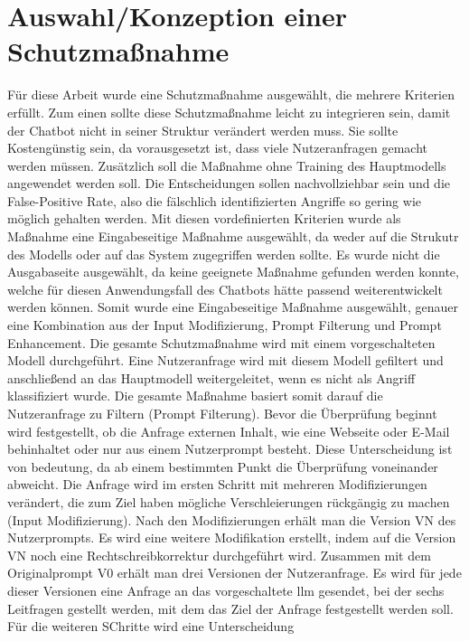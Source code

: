 \section{Auswahl/Konzeption einer Schutzmaßnahme}\label{konzept}

Für diese Arbeit wurde eine Schutzmaßnahme ausgewählt, die mehrere Kriterien erfüllt. Zum einen sollte diese Schutzmaßnahme leicht zu integrieren sein, damit der
Chatbot nicht in seiner Struktur verändert werden muss. Sie sollte Kostengünstig sein, da vorausgesetzt ist, dass viele Nutzeranfragen gemacht werden müssen.
Zusätzlich soll die Maßnahme ohne Training des Hauptmodells angewendet werden soll. Die Entscheidungen sollen nachvollziehbar sein und die False-Positive Rate, also
die fälschlich identifizierten Angriffe so gering wie möglich gehalten werden. 
Mit diesen vordefinierten Kriterien wurde als Maßnahme eine Eingabeseitige Maßnahme ausgewählt, da weder auf die Strukutr des Modells oder auf das System zugegriffen 
werden sollte. Es wurde nicht die Ausgabaseite ausgewählt, da keine geeignete Maßnahme gefunden werden konnte, welche  für diesen Anwendungsfall des Chatbots hätte
passend weiterentwickelt werden können. Somit wurde eine Eingabeseitige Maßnahme ausgewählt, genauer eine Kombination aus der Input Modifizierung, Prompt Filterung
und Prompt Enhancement. 
Die gesamte Schutzmaßnahme wird mit einem vorgeschalteten Modell durchgeführt. Eine Nutzeranfrage wird mit diesem Modell gefiltert und anschließend an das Hauptmodell
weitergeleitet, wenn es nicht als Angriff klassifiziert wurde. Die gesamte Maßnahme basiert somit darauf die Nutzeranfrage zu Filtern (Prompt Filterung). Bevor die 
Überprüfung beginnt wird festgestellt, ob die Anfrage externen Inhalt, wie eine Webseite oder E-Mail behinhaltet oder nur aus einem Nutzerprompt besteht. Diese
Unterscheidung ist von bedeutung, da ab einem bestimmten Punkt die Überprüfung voneinander abweicht. Die Anfrage
wird im ersten Schritt mit mehreren Modifizierungen verändert, die zum Ziel haben mögliche Verschleierungen rückgängig zu machen (Input Modifizierung). Nach den 
Modifizierungen erhält man die Version VN des Nutzerprompts. Es wird eine weitere Modifikation erstellt, indem auf die Version VN noch eine Rechtschreibkorrektur 
durchgeführt wird. Zusammen mit dem Originalprompt V0 erhält man drei Versionen der Nutzeranfrage. Es wird für jede dieser Versionen eine Anfrage an das vorgeschaltete
\ac{llm} gesendet, bei der sechs Leitfragen gestellt werden, mit dem das Ziel der Anfrage festgestellt werden soll. Für die weiteren SChritte wird eine Unterscheidung
